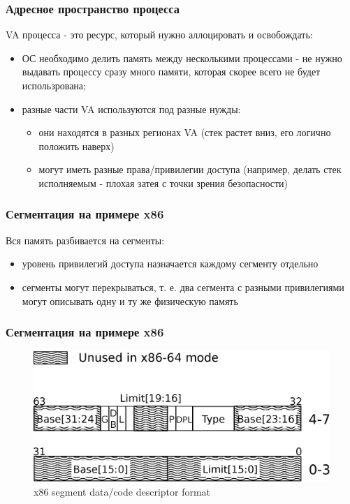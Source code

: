\begin{frame}
\frametitle{Адресное пространство процесса}

VA процесса - это ресурс, который нужно аллоцировать и освобождать:
\begin{itemize}
  \item<2-> ОС необходимо делить память между несколькими процессами - не нужно
выдавать процессу сразу много памяти, которая скорее всего не будет
использрована;
  \item<3-> разные части VA используются под разные нужды:
    \begin{itemize}
      \item они находятся в разных регионах VA (стек растет вниз, его логично положить наверх)
      \item могут иметь разные права/привилегии доступа (например, делать стек исполняемым - плохая затея с точки зрения безопасности)
    \end{itemize}
\end{itemize}
\end{frame}

\begin{frame}
\frametitle{Сегментация на примере x86}

Вся память разбивается на сегменты:
\begin{itemize}
  \item уровень привилегий доступа назначается каждому сегменту отдельно
  \item сегменты могут перекрываться, т. е. два сегмента с разными привилегиями могут описывать одну и ту же физическую память
\end{itemize}

\end{frame}

\begin{frame}
\frametitle{Сегментация на примере x86}

\begin{figure}
\centering\includegraphics[width=.9\linewidth]{arch-segd}
\caption{x86 segment data/code descriptor format}
\end{figure}

\end{frame}

